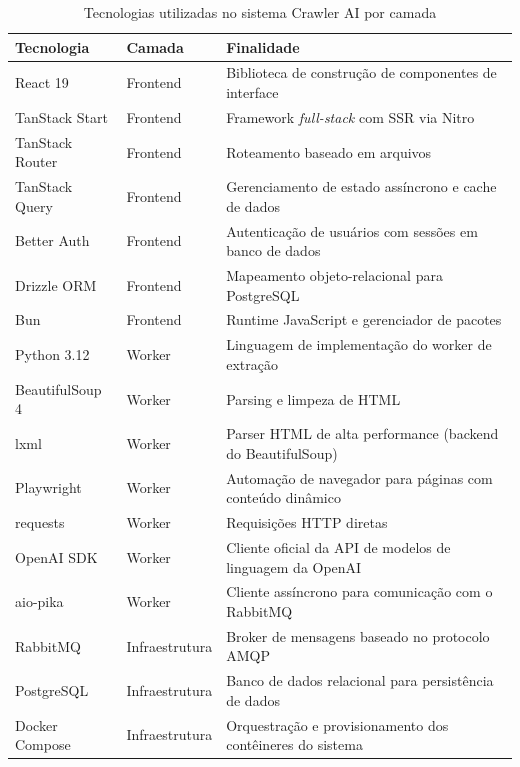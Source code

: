 \documentclass[tcc,capa]{texifsul}
\begin{document}
\begin{table}[htbp]
\centering
\caption{Tecnologias utilizadas no sistema Crawler AI por camada}
\label{tab:tecnologias}
\begin{tabular}{llp{7cm}}
\hline
\textbf{Tecnologia} & \textbf{Camada} & \textbf{Finalidade} \\
\hline
React 19            & Frontend        & Biblioteca de construção de componentes de interface \\
TanStack Start      & Frontend        & Framework \textit{full-stack} com SSR via Nitro \\
TanStack Router     & Frontend        & Roteamento baseado em arquivos \\
TanStack Query      & Frontend        & Gerenciamento de estado assíncrono e cache de dados \\
Better Auth         & Frontend        & Autenticação de usuários com sessões em banco de dados \\
Drizzle ORM         & Frontend        & Mapeamento objeto-relacional para PostgreSQL \\
Bun                 & Frontend        & Runtime JavaScript e gerenciador de pacotes \\
\hline
Python 3.12         & Worker          & Linguagem de implementação do worker de extração \\
BeautifulSoup 4     & Worker          & Parsing e limpeza de HTML \\
lxml                & Worker          & Parser HTML de alta performance (backend do BeautifulSoup) \\
Playwright          & Worker          & Automação de navegador para páginas com conteúdo dinâmico \\
requests            & Worker          & Requisições HTTP diretas \\
OpenAI SDK          & Worker          & Cliente oficial da API de modelos de linguagem da OpenAI \\
aio-pika            & Worker          & Cliente assíncrono para comunicação com o RabbitMQ \\
\hline
RabbitMQ            & Infraestrutura  & Broker de mensagens baseado no protocolo AMQP \\
PostgreSQL          & Infraestrutura  & Banco de dados relacional para persistência de dados \\
Docker Compose      & Infraestrutura  & Orquestração e provisionamento dos contêineres do sistema \\
\hline
\end{tabular}
\end{table}
\end{document}

